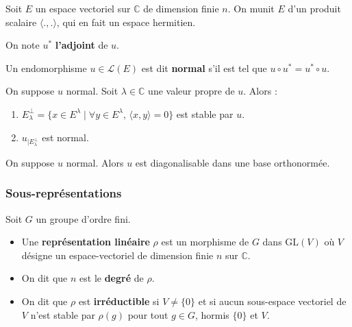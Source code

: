   Soit $E$ un espace vectoriel sur $\mathbb{C}$ de dimension finie $n$. On munit $E$ d'un produit scalaire $\langle . , . \rangle$, qui en fait un espace hermitien.


  \begin{notation}
    On note $u^*$ \textbf{l'adjoint} de $u$.
  \end{notation}

  \begin{definition}
    Un endomorphisme $u \in \mathcal{L}(E)$ est dit \textbf{normal} s'il est tel que $u \circ u^* = u^* \circ u$.
  \end{definition}

  \begin{proposition}
    On suppose $u$ normal. Soit $\lambda \in \mathbb{C}$ une valeur propre de $u$. Alors :
    \begin{enumerate}[label=(\roman*)]
      \item $E_\lambda^\perp = \{ x \in E^\lambda \mid \forall y \in E^\lambda, \, \langle x, y \rangle = 0 \}$ est stable par $u$.
      \item $u_{| E_\lambda^\perp}$ est normal.
    \end{enumerate}
  \end{proposition}

  \begin{corollary}
    On suppose $u$ normal. Alors $u$ est diagonalisable dans une base orthonormée.
  \end{corollary}

  \subsubsection{Sous-représentations}


  Soit $G$ un groupe d'ordre fini.

  \begin{definition}
    \begin{itemize}
      \item Une \textbf{représentation linéaire} $\rho$ est un morphisme de $G$ dans $\mathrm{GL}(V)$ où $V$ désigne un espace-vectoriel de dimension finie $n$ sur $\mathbb{C}$.
      \item On dit que $n$ est le \textbf{degré} de $\rho$.
      \item On dit que $\rho$ est \textbf{irréductible} si $V \neq \{ 0 \}$ et si aucun sous-espace vectoriel de $V$ n'est stable par $\rho(g)$ pour tout $g \in G$, hormis $\{ 0 \}$ et $V$.
    \end{itemize}
  \end{definition}

